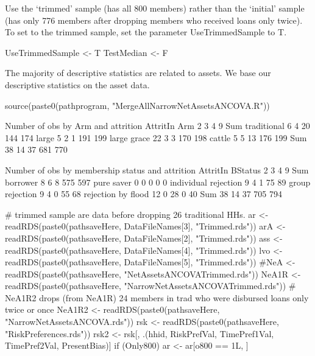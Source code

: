 Use the `trimmed' sample (has all 800 members) rather than the `initial' sample (has only 776 members after dropping members who received loans only twice). To set to the trimmed sample, set the parameter \textsf{UseTrimmedSample} to T.
\begin{Schunk}
\begin{Sinput}
UseTrimmedSample <- T
TestMedian <- F
\end{Sinput}
\end{Schunk}

The majority of descriptive statistics are related to assets. We base our descriptive statistics on the asset data.

\begin{Schunk}
\begin{Sinput}
source(paste0(pathprogram, "MergeAllNarrowNetAssetsANCOVA.R"))
\end{Sinput}
\begin{Soutput}


Number of obs by Arm and attrition
             AttritIn
Arm             2   3   4   9 Sum
  traditional   6   4  20 144 174
  large         5   2   1 191 199
  large grace  22   3   3 170 198
  cattle        5   5  13 176 199
  Sum          38  14  37 681 770


Number of obs by membership status and attrition
                      AttritIn
BStatus                  2   3   4   9 Sum
  borrower               8   6   8 575 597
  pure saver             0   0   0   0   0
  individual rejection   9   4   1  75  89
  group rejection        9   4   0  55  68
  rejection by flood    12   0  28   0  40
  Sum                   38  14  37 705 794
\end{Soutput}
\end{Schunk}
\begin{Schunk}
\begin{Sinput}
#  trimmed sample are data before dropping 26 traditional HHs.
ar <- readRDS(paste0(pathsaveHere, DataFileNames[3], "Trimmed.rds"))
arA <- readRDS(paste0(pathsaveHere, DataFileNames[2], "Trimmed.rds"))
ass <- readRDS(paste0(pathsaveHere, DataFileNames[4], "Trimmed.rds"))
lvo <- readRDS(paste0(pathsaveHere, DataFileNames[5], "Trimmed.rds"))
#NeA <- readRDS(paste0(pathsaveHere, "NetAssetsANCOVATrimmed.rds"))
NeA1R <- readRDS(paste0(pathsaveHere, "NarrowNetAssetsANCOVATrimmed.rds"))
# NeA1R2 drops (from NeA1R) 24 members in trad who were disbursed loans only twice or once
NeA1R2 <- readRDS(paste0(pathsaveHere, "NarrowNetAssetsANCOVA.rds"))
rsk <- readRDS(paste0(pathsaveHere, "RiskPreferences.rds"))
rsk2 <- rsk[, .(hhid, RiskPrefVal, TimePref1Val, TimePref2Val, PresentBias)]
if (Only800) ar <- ar[o800 == 1L, ]
\end{Sinput}
\end{Schunk}
